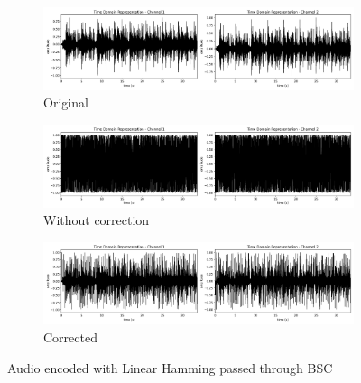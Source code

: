 \documentclass{article}
\begin{document}
\begin{figure}[htb]
    \centering
    \begin{subfigure}[b]{\textwidth}
        \centering
        \includegraphics[width=\textwidth]{../Result/Linear/wav-time-domain-TX.png}
        \caption{Original}
        \label{fig:t-audio-linear-bsc-original}
    \end{subfigure}
    \begin{subfigure}[b]{\textwidth}
        \centering
        \includegraphics[width=\textwidth]{../Result/Linear/linear-bsc-wav-time-domain-RX.png}
        \caption{Without correction}
        \label{fig:t-audio-linear-bsc-no-correction}
    \end{subfigure}
    \begin{subfigure}[b]{\textwidth}
        \centering
        \includegraphics[width=\textwidth]{../Result/Linear/linear-bsc-wav-time-domain-RX-syndrome-corrected.png}
        \caption{Corrected}
        \label{fig:t-audio-linear-bsc-syndrome-syndrome-corrected}
    \end{subfigure}
       \caption{Audio encoded with Linear Hamming passed through BSC}
       \label{fig:t-audio-linear-bsc}
\end{figure}
\end{document}
